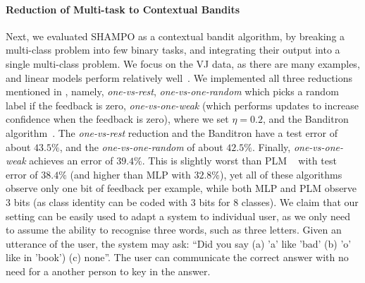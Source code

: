 


\paragraph{Reduction of Multi-task to Contextual Bandits }
Next, we evaluated SHAMPO as a contextual bandit algorithm, by breaking a multi-class problem into few 
binary tasks, and integrating their output into a single multi-class problem. 
We focus on the VJ data, as there are many examples, and linear models perform relatively 
well~\cite{lin2009lose}.  We implemented all three reductions
mentioned in , namely, {\em one-vs-rest}, {\em one-vs-one-random} which picks a 
random label if the feedback is zero, {\em one-vs-one-weak} (which performs updates to increase 
confidence when the feedback is zero), where we set $\eta=0.2$, and the 
Banditron algorithm~\cite{kakade2008efficient}.
The  {\em one-vs-rest} reduction and the Banditron have a test error of about $43.5\%$, and the 
{\em one-vs-one-random} of about $42.5\%$.
Finally, {\em one-vs-one-weak} achieves an error of $39.4\%$.
 This is slightly worst than PLM
~\cite{lin2009lose} with test error of $38.4\%$ (and higher than MLP with $32.8\%$), 
yet all of these algorithms observe only one bit of feedback per example, while both MLP and PLM 
observe $3$ bits (as class identity can be coded with $3$ bits for $8$ classes). We claim that our setting 
can be easily used to adapt a system to individual user, as we only need to assume the ability to recognise 
three words, such as three letters. Given an utterance of the user, the system may ask: 
``Did you say (a) 'a' like 'bad' (b) 'o' like in 'book') (c) none''. The user can communicate the correct answer 
with no need for a another person to key in the answer.
